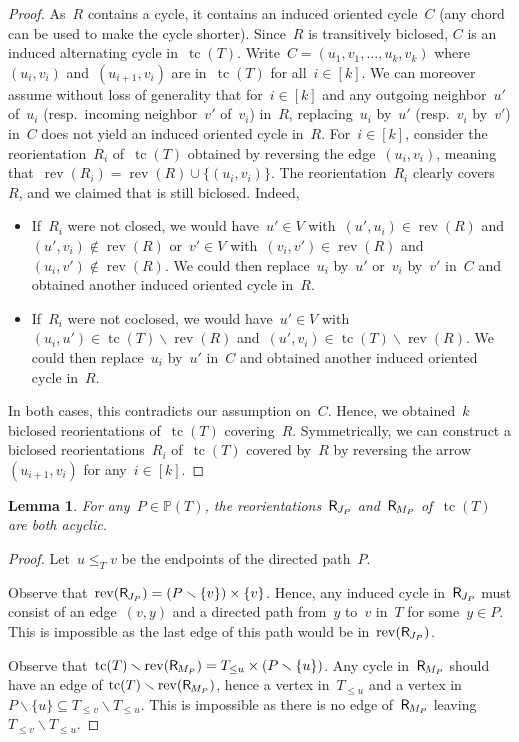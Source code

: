 \documentclass{amsart}
\newtheorem{lemma}[theorem]{Lemma}
\theoremstyle{definition}
\newcommand{\ssm}{\smallsetminus} %
\DeclareMathOperator{\tc}{tc} %
\newcommand{\lessin}[2]{#1_{\le#2}} %
\newcommand{\mymap}[2]{\mathsf{#1}_{\hspace{-.7pt}#2}}
\newcommand{\reori}[1]{\mymap{R}{#1}}  %
\DeclareMathOperator{\rev}{rev} %
\newcommand{\PP}{\mathbb P} %
\begin{document}
\begin{proof}
As~$R$ contains a cycle, it contains an induced oriented cycle~$C$ (any chord can be used to make the cycle shorter).
Since~$R$ is transitively biclosed, $C$ is an induced alternating cycle in~$\tc(T)$.
Write~$C = (u_1, v_1, \dots, u_k, v_k)$ where~$(u_i, v_i)$ and~$(u_{i+1},v_i)$ are in~$\tc(T)$ for all~$i \in [k]$.
We can moreover assume without loss of generality that for~$i \in [k]$ and any outgoing neighbor~$u'$ of~$u_i$ (resp.~incoming neighbor~$v'$ of~$v_i$) in~$R$, replacing~$u_i$ by~$u'$ (resp.~$v_i$ by~$v'$) in~$C$ does not yield an induced oriented cycle in~$R$.
For~$i \in [k]$, consider the reorientation~$R_i$ of~$\tc(T)$ obtained by reversing the edge~$(u_i,v_i)$, meaning that~$\rev(R_i) = \rev(R) \cup \{(u_i,v_i)\}$.
The reorientation~$R_i$ clearly covers~$R$, and we claimed that is still biclosed.
Indeed,
\begin{itemize}
\item If~$R_i$ were not closed, we would have~$u' \in V$ with~$(u',u_i) \in \rev(R)$ and~$(u',v_i) \notin \rev(R)$ or~$v' \in V$ with~$(v_i, v') \in \rev(R)$ and~$(u_i,v') \notin \rev(R)$. We could then replace~$u_i$ by~$u'$ or~$v_i$ by~$v'$ in~$C$ and obtained another induced oriented cycle in~$R$.
\item If~$R_i$ were not coclosed, we would have~$u' \in V$ with~$(u_i,u') \in \tc(T) \ssm \rev(R)$ and~$(u',v_i) \in \tc(T) \ssm \rev(R)$. We could then replace~$u_i$ by~$u'$ in~$C$ and obtained another induced oriented cycle in~$R$.
\end{itemize}
In both cases, this contradicts our assumption on~$C$.
Hence, we obtained~$k$ biclosed reorientations of~$\tc(T)$ covering~$R$.
Symmetrically, we can construct a biclosed reorientations~$R_i$ of~$\tc(T)$ covered by~$R$ by reversing the arrow~$(u_{i+1}, v_i)$ for any~$i \in [k]$.
\end{proof}

\begin{lemma}
\label{lem:irreduciblesOrnamentationsAcyclicT}
For any~$P \in \PP(T)$, the reorientations~$\reori{J_P}$ and~$\reori{M_P}$ of~$\tc(T)$ are both acyclic.
\end{lemma}

\begin{proof}
Let~$u \le_T v$ be the endpoints of the directed path~$P$.

Observe that~$\rev(\reori{J_P})= (P \ssm \{v\}) \times \{v\}$.
Hence, any induced cycle in~$\reori{J_P}$ must consist of an edge~$(v,y)$ and a directed path from~$y$ to~$v$ in~$T$ for some~$y \in P$.
This is impossible as the last edge of this path would be in~$\rev(\reori{J_P})$.

Observe that~$\tc(T) \ssm \rev(\reori{M_P}) = \lessin{T}{u} \times (P \ssm \{u\})$.
Any cycle in~$\reori{M_P}$ should have an edge of $\tc(T) \ssm \rev(\reori{M_P})$, hence a vertex in~$\lessin{T}{u}$ and a vertex in~$P \ssm \{u\} \subseteq T_{\le v} \ssm T_{\le u}$.
This is impossible as there is no edge of~$\reori{M_P}$ leaving~$T_{\le v} \ssm T_{\le u}$.
\end{proof}
\end{document}
